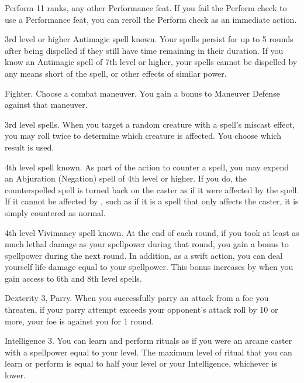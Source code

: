 \featpres Perform 11 ranks, any other Performance feat.
\featben If you fail the Perform check to use a Performance feat, you can reroll the Perform check as an immediate action.

\featpre 3rd level or higher Antimagic spell known.
\featben Your spells persist for up to 5 rounds after being dispelled if they still have time remaining in their duration.
If you know an Antimagic spell of 7th level or higher, your spells cannot be dispelled by any means short of the  spell, or other effects of similar power.

\featpre Fighter.
\featben Choose a combat maneuver.
You gain a  bonus to Maneuver Defense against that maneuver.

\featpre 3rd level spells.
\featben When you target a random creature with a spell's miscast effect, you may roll twice to determine which creature is affected.
You choose which result is used.

\featpre 4th level spell known.
\featben As part of the action to counter a spell, you may expend an Abjuration (Negation) spell of 4th level or higher.
If you do, the counterspelled spell is turned back on the caster as if it were affected by the 
spell.
If it cannot be affected by , such as if it is a spell that only affects the caster, it is simply countered as normal.

\featpre 4th level Vivimancy spell known.
\featben At the end of each round, if you took at least as much lethal damage as your spellpower during that round, you gain a  bonus to spellpower during the next round.
In addition, as a swift action, you can deal yourself life damage equal to your spellpower.
This bonus increases by  when you gain access to 6th and 8th level spells.

\featpres Dexterity 3, Parry.
\featben When you successfully parry an attack from a foe you threaten, if your parry attempt exceeds your opponent's attack roll by 10 or more, your foe is  against you for 1 round.

\featpre Intelligence 3.
\featben You can learn and perform rituals as if you were an arcane caster with a spellpower equal to your level.
The maximum level of ritual that you can learn or perform is equal to half your level or your Intelligence, whichever is lower.

